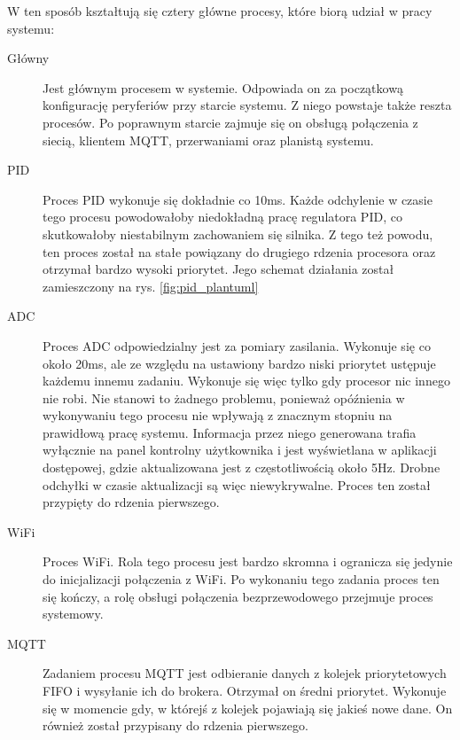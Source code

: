             W ten sposób kształtują się cztery główne procesy, które biorą udział w pracy systemu:
            
            \begin{description}
                \item [Główny] Jest głównym procesem w systemie. Odpowiada on za początkową konfigurację peryferiów przy starcie systemu. Z niego powstaje także reszta procesów. Po poprawnym starcie zajmuje się on obsługą połączenia z siecią, klientem MQTT, przerwaniami oraz planistą systemu. 
                
                \item [PID] Proces PID wykonuje się dokładnie co 10ms. Każde odchylenie w czasie tego procesu powodowałoby niedokładną pracę regulatora PID, co skutkowałoby niestabilnym zachowaniem się silnika. Z tego też powodu, ten proces został na stałe powiązany do drugiego rdzenia procesora oraz otrzymał bardzo wysoki priorytet. Jego schemat działania został zamieszczony na rys. \ref{fig:pid_plantuml} 
                
                \item [ADC] Proces ADC odpowiedzialny jest za pomiary zasilania. Wykonuje się co około 20ms, ale ze względu na ustawiony bardzo niski priorytet ustępuje każdemu innemu zadaniu. Wykonuje się więc tylko gdy procesor nic innego nie robi. Nie stanowi to żadnego problemu, ponieważ opóźnienia w wykonywaniu tego procesu nie wpływają z znacznym stopniu na prawidłową pracę systemu. Informacja przez niego generowana trafia wyłącznie na panel kontrolny użytkownika i jest wyświetlana w aplikacji dostępowej, gdzie aktualizowana jest z częstotliwością około 5Hz. Drobne odchyłki w czasie aktualizacji są więc niewykrywalne. Proces ten został przypięty do rdzenia pierwszego.
                
                \item [WiFi] Proces WiFi. Rola tego procesu jest bardzo skromna i ogranicza się jedynie do inicjalizacji połączenia z WiFi. Po wykonaniu tego zadania proces ten się kończy, a rolę obsługi połączenia bezprzewodowego przejmuje proces systemowy.
                
                \item [MQTT] Zadaniem procesu MQTT jest odbieranie danych z kolejek priorytetowych FIFO i wysyłanie ich do brokera. Otrzymał on średni priorytet. Wykonuje się w momencie gdy, w którejś z kolejek pojawiają się jakieś nowe dane. On również został przypisany do rdzenia pierwszego.
                
            \end{description}
            

